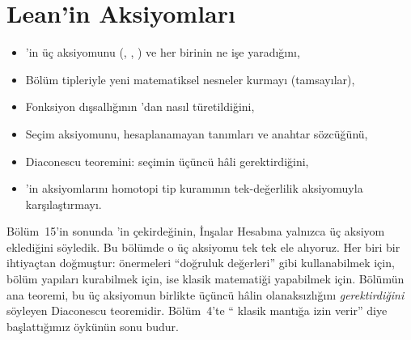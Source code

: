 \chapter{Lean'in Aksiyomları}\label{bol:aksiyomlar}

\begin{bolumhedefleri}
\begin{itemize}
  \item \Lean{}'in üç aksiyomunu (, ,
        ) ve her birinin ne işe yaradığını,
  \item Bölüm tipleriyle yeni matematiksel nesneler kurmayı (tamsayılar),
  \item Fonksiyon dışsallığının 'dan nasıl türetildiğini,
  \item Seçim aksiyomunu, hesaplanamayan tanımları ve 
        anahtar sözcüğünü,
  \item Diaconescu teoremini: seçimin üçüncü hâli gerektirdiğini,
  \item \Lean{}'in aksiyomlarını homotopi tip kuramının tek-değerlilik
        aksiyomuyla karşılaştırmayı.
\end{itemize}
\end{bolumhedefleri}

Bölüm~15'in sonunda \Lean{}'in çekirdeğinin, İnşalar Hesabına yalnızca
üç aksiyom eklediğini söyledik. Bu bölümde o üç aksiyomu tek tek ele
alıyoruz. Her biri bir ihtiyaçtan doğmuştur:  önermeleri
``doğruluk değerleri'' gibi kullanabilmek için,  bölüm
yapıları kurabilmek için,  ise klasik matematiği
yapabilmek için. Bölümün ana teoremi, bu üç aksiyomun birlikte üçüncü
hâlin olanaksızlığını \emph{gerektirdiğini} söyleyen Diaconescu
teoremidir. Bölüm~4'te ``\Lean{} klasik mantığa izin verir'' diye
başlattığımız öykünün sonu budur.

